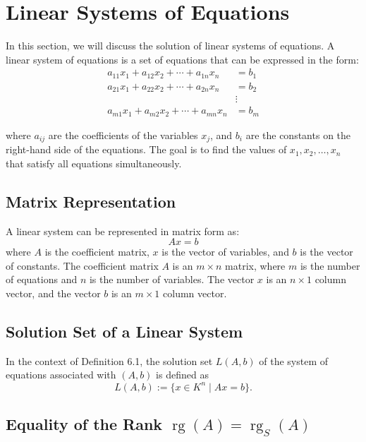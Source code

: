 \newpage
\section{Linear Systems of Equations}

In this section, we will discuss the solution of linear systems of equations. A linear system of equations is a set of equations that can be expressed in the form:
\begin{align*}
a_{11}x_1 + a_{12}x_2 + \cdots + a_{1n}x_n & = b_1  \\
a_{21}x_1 + a_{22}x_2 + \cdots + a_{2n}x_n & = b_2  \\
& \vdots \\
a_{m1}x_1 + a_{m2}x_2 + \cdots + a_{mn}x_n & = b_m
\end{align*}

where \( a_{ij} \) are the coefficients of the variables \( x_j \), and \( b_i \) are the constants on the right-hand side of the equations. The goal is to find the values of \( x_1, x_2, \ldots, x_n \) that satisfy all equations simultaneously.

\subsection{Matrix Representation}

A linear system can be represented in matrix form as:
\begin{equation*}
	A x = b
\end{equation*}
where \( A \) is the coefficient matrix, \( x \) is the vector of variables, and \( b \) is the vector of constants. The coefficient matrix \( A \) is an \( m \times n \) matrix, where \( m \) is the number of equations and \( n \) is the number of variables.
The vector \( x \) is an \( n \times 1 \) column vector, and the vector \( b \) 
is an \( m \times 1 \) column vector. 


\subsection{Solution Set of a Linear System}

In the context of Definition 6.1, the solution set \( L(A, b) \) of the system of equations associated with \( (A, b) \) is defined as
\[
L(A, b) := \{ x \in K^n \mid Ax = b \}.
\]

\subsection{Equality of the Rank \(\operatorname{rg}(A) = \operatorname{rg}_S(A)\)}

